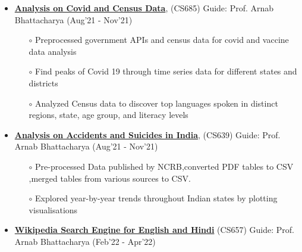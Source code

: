 \documentclass[10.8pt, a4paper]{extarticle}
\begin{document}
\begin{itemize}
\item \href{https://github.com/jeetsarangi/Census-Data-Analysis}{\textbf{Analysis on Covid and Census Data}}, (CS685) Guide: Prof. Arnab Bhattacharya   \hfill(Aug'21 - Nov'21)
	\\[-0.6cm]
	\begin{itemize}
	      \item[$\circ$] Preprocessed government APIs and census data for covid and vaccine data analysis\\[-0.6cm]
    \item[$\circ$] Find peaks of Covid 19 through time series data for different states and districts\\[-0.6cm]
    \item[$\circ$] Analyzed Census data to discover top languages spoken in distinct regions, state, age group, and literacy levels\\[-0.6cm]
	\end{itemize}


	\item \href{https://github.com/jeetsarangi/Accidents-and-suicides-in-India-Analysis}{\textbf{Analysis on Accidents and Suicides in India}}, (CS639) Guide: Prof. Arnab Bhattacharya \hfill(Aug'21 - Nov'21)
	\\[-0.6cm]
	\begin{itemize}
	      \item [$\circ$] Pre-processed Data published by NCRB,converted PDF tables to CSV ,merged tables from various sources to CSV.\\[-0.6cm]
	      \item [$\circ$] Explored year-by-year trends throughout Indian states by plotting visualisations
	      \\[-0.6cm]
	      
	\end{itemize}


\item\href{https://github.com/jeetsarangi/Wikipedia-Article-Retrieval-System} {\textbf{Wikipedia Search Engine for English and Hindi}} (CS657) Guide: Prof.  Arnab Bhattacharya   \hfill(Feb'22 - Apr'22)
	\\[-0.6cm]
	\begin{itemize}
	

\end{itemize}
\end{itemize}
\end{document}
